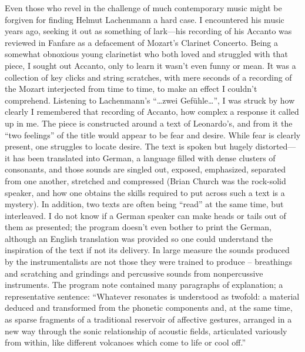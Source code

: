 Even those who revel in the challenge of much contemporary music might be forgiven for finding Helmut Lachenmann a hard case. I encountered his music years ago, seeking it out as something of lark—his recording of his Accanto was reviewed in Fanfare as a defacement of Mozart’s Clarinet Concerto. Being a somewhat obnoxious young clarinetist who both loved and struggled with that piece, I sought out Accanto, only to learn it wasn’t even funny or mean. It was a collection of key clicks and string scratches, with mere seconds of a recording of the Mozart interjected from time to time, to make an effect I couldn’t comprehend. Listening to Lachenmann’s “…zwei Gefühle…”, I was struck by how clearly I remembered that recording of Accanto, how complex a response it called up in me. The piece is constructed around a text of Leonardo’s, and from it the “two feelings” of the title would appear to be fear and desire. While fear is clearly present, one struggles to locate desire. The text is spoken but hugely distorted—it has been translated into German, a language filled with dense clusters of consonants, and those sounds are singled out, exposed, emphasized, separated from one another, stretched and compressed (Brian Church was the rock-solid speaker, and how one obtains the skills required to put across such a text is a mystery). In addition, two texts are often being “read” at the same time, but interleaved. I do not know if a German speaker can make heads or tails out of them as presented; the program doesn’t even bother to print the German, although an English translation was provided so one could understand the inspiration of the text if not its delivery. In large measure the sounds produced by the instrumentalists are not those they were trained to produce – breathings and scratching and grindings and percussive sounds from nonpercussive instruments. The program note contained many paragraphs of explanation; a representative sentence: “Whatever resonates is understood as twofold: a material deduced and transformed from the phonetic components and, at the same time, as sparse fragments of a traditional reservoir of affective gestures, arranged in a new way through the sonic relationship of acoustic fields, articulated variously from within, like different volcanoes which come to life or cool off.”

